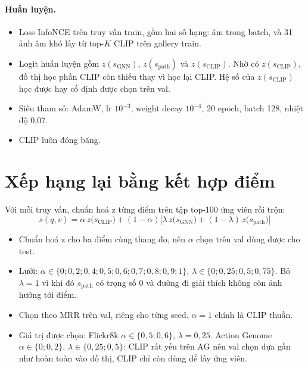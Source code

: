 \documentclass[11pt,a4paper]{article}
\begin{document}
\paragraph{Huấn luyện.}
\begin{itemize}
  \item Loss InfoNCE trên truy vấn train, gồm hai số hạng: âm trong batch, và 31 ảnh âm khó lấy từ top-\(K\) CLIP trên gallery train.
  \item Logit huấn luyện gồm \(z(s_{\text{GNN}})\), \(z(s_{\text{path}})\) và \(z(s_{\text{CLIP}})\). Nhờ có \(z(s_{\text{CLIP}})\), đồ thị học phần CLIP còn thiếu thay vì học lại CLIP. Hệ số của \(z(s_{\text{CLIP}})\) học được hay cố định được chọn trên val.
  \item Siêu tham số: AdamW, lr \(10^{-3}\), weight decay \(10^{-4}\), 20 epoch, batch 128, nhiệt độ 0,07.
  \item CLIP luôn đóng băng.
\end{itemize}

\section{Xếp hạng lại bằng kết hợp điểm}\label{sec:rerank}

Với mỗi truy vấn, chuẩn hoá z từng điểm trên tập top-100 ứng viên rồi trộn:
\[
\boxed{\;s(q,v)=\alpha\,z\big(s_{\text{CLIP}}\big)+(1-\alpha)\Big[\lambda\,z\big(s_{\text{GNN}}\big)+(1-\lambda)\,z\big(s_{\text{path}}\big)\Big]\;}
\]
\begin{itemize}
  \item Chuẩn hoá z cho ba điểm cùng thang đo, nên \(\alpha\) chọn trên val dùng được cho test.
  \item Lưới: \(\alpha\in\{0;0{,}2;0{,}4;0{,}5;0{,}6;0{,}7;0{,}8;0{,}9;1\}\), \(\lambda\in\{0;0{,}25;0{,}5;0{,}75\}\). Bỏ \(\lambda=1\) vì khi đó \(s_{\text{path}}\) có trọng số 0 và đường đi giải thích không còn ảnh hưởng tới điểm.
  \item Chọn theo MRR trên val, riêng cho từng seed. \(\alpha=1\) chính là CLIP thuần.
  \item Giá trị được chọn: Flickr8k \(\alpha\in\{0{,}5;0{,}6\}\), \(\lambda=0{,}25\). Action Genome \(\alpha\in\{0;0{,}2\}\), \(\lambda\in\{0{,}25;0{,}5\}\): CLIP rất yếu trên AG nên val chọn dựa gần như hoàn toàn vào đồ thị, CLIP chỉ còn dùng để lấy ứng viên.
\end{itemize}
\end{document}
